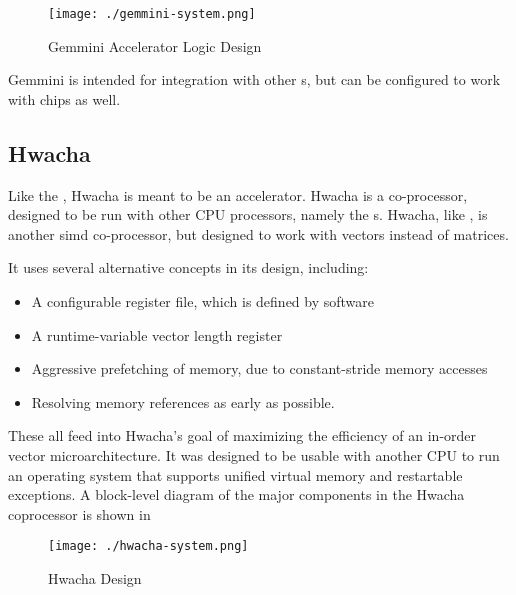 \begin{figure}[h!tbp]
  \centering
  \texttt{[image: ./gemmini-system.png]}
  \caption{Gemmini Accelerator Logic Design \parencite{gemminiGithub}}
  \label{fig:Gemmini_Accelerator}
\end{figure}

Gemmini is intended for integration with other s, but can be configured to work with  chips as well.

\subsection{Hwacha}\label{sec:Hwacha}
\nocite{hwachaGithub}
\nocite{hwachaPresentation}
Like the , Hwacha is meant to be an \gls{accelerator}.
Hwacha is a co-processor, designed to be run with other CPU processors, namely the s.
Hwacha, like , is another \gls{simd} co-processor, but designed to work with vectors instead of matrices.

It uses several alternative concepts in its design, including:
\begin{itemize}
\item A configurable register file, which is defined by software
\item A runtime-variable vector length register
\item Aggressive prefetching of memory, due to constant-stride memory accesses
\item Resolving memory references as early as possible.
\end{itemize}

These all feed into Hwacha's goal of maximizing the efficiency of an in-order vector microarchitecture.
It was designed to be usable with another CPU to run an operating system that supports unified virtual memory and restartable exceptions.
A block-level diagram of the major components in the Hwacha coprocessor is shown in 

\begin{figure}[h!tbp]
  \centering
  \texttt{[image: ./hwacha-system.png]}
  \caption{Hwacha Design~\cite[p.~11]{hwachaPresentation}}
  \label{fig:Hwacha_Accelerator}
\end{figure}

